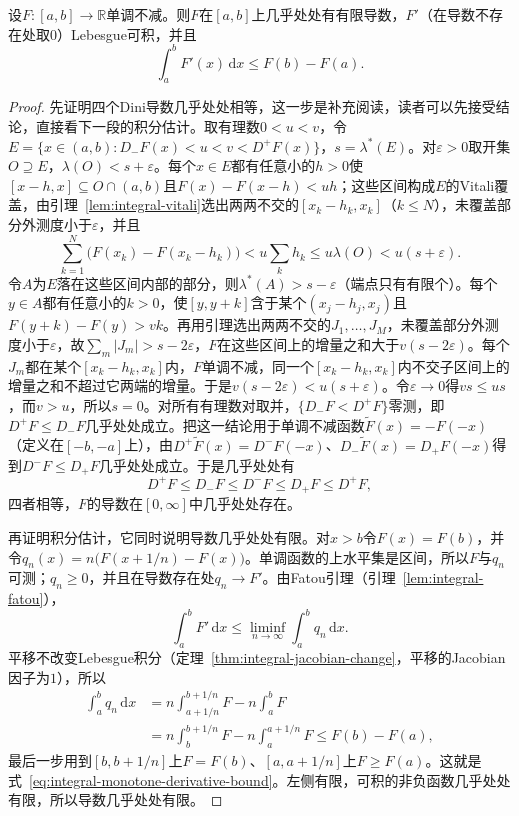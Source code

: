 \begin{theorem}[单调函数几乎处处可导]
\label{thm:integral-monotone-differentiable}
设$F:[a,b]\to\mathbb R$单调不减。则$F$在$[a,b]$上几乎处处有有限导数，$F'$（在导数不存在处取$0$）Lebesgue可积，并且
\begin{equation}
 \int_a^bF'(x)\,\mathrm dx\le F(b)-F(a).
 \label{eq:integral-monotone-derivative-bound}
\end{equation}
\end{theorem}

\begin{proof}
先证明四个Dini导数几乎处处相等，这一步是补充阅读，读者可以先接受结论，直接看下一段的积分估计。取有理数$0<u<v$，令$E=\{x\in(a,b):D_-F(x)<u<v<D^+F(x)\}$，$s=\lambda^*(E)$。对$\varepsilon>0$取开集$O\supseteq E$，$\lambda(O)<s+\varepsilon$。每个$x\in E$都有任意小的$h>0$使$[x-h,x]\subseteq O\cap(a,b)$且$F(x)-F(x-h)<uh$；这些区间构成$E$的Vitali覆盖，由引理~\ref{lem:integral-vitali}选出两两不交的$[x_k-h_k,x_k]$（$k\le N$），未覆盖部分外测度小于$\varepsilon$，并且
\[
 \sum_{k=1}^N\bigl(F(x_k)-F(x_k-h_k)\bigr)<u\sum_kh_k\le u\lambda(O)<u(s+\varepsilon).
\]
令$A$为$E$落在这些区间内部的部分，则$\lambda^*(A)>s-\varepsilon$（端点只有有限个）。每个$y\in A$都有任意小的$k>0$，使$[y,y+k]$含于某个$(x_j-h_j,x_j)$且$F(y+k)-F(y)>vk$。再用引理选出两两不交的$J_1,\ldots,J_M$，未覆盖部分外测度小于$\varepsilon$，故$\sum_m|J_m|>s-2\varepsilon$，$F$在这些区间上的增量之和大于$v(s-2\varepsilon)$。每个$J_m$都在某个$[x_k-h_k,x_k]$内，$F$单调不减，同一个$[x_k-h_k,x_k]$内不交子区间上的增量之和不超过它两端的增量。于是$v(s-2\varepsilon)<u(s+\varepsilon)$。令$\varepsilon\to0$得$vs\le us$，而$v>u$，所以$s=0$。对所有有理数对取并，$\{D_-F<D^+F\}$零测，即$D^+F\le D_-F$几乎处处成立。把这一结论用于单调不减函数$\tilde F(x)=-F(-x)$（定义在$[-b,-a]$上），由$D^+\tilde F(x)=D^-F(-x)$、$D_-\tilde F(x)=D_+F(-x)$得到$D^-F\le D_+F$几乎处处成立。于是几乎处处有
\[
 D^+F\le D_-F\le D^-F\le D_+F\le D^+F,
\]
四者相等，$F$的导数在$[0,\infty]$中几乎处处存在。

再证明积分估计，它同时说明导数几乎处处有限。对$x>b$令$F(x)=F(b)$，并令$q_n(x)=n\bigl(F(x+1/n)-F(x)\bigr)$。单调函数的上水平集是区间，所以$F$与$q_n$可测；$q_n\ge0$，并且在导数存在处$q_n\to F'$。由Fatou引理（引理~\ref{lem:integral-fatou}），
\[
 \int_a^bF'\,\mathrm dx\le\liminf_{n\to\infty}\int_a^bq_n\,\mathrm dx.
\]
平移不改变Lebesgue积分（定理~\ref{thm:integral-jacobian-change}，平移的Jacobian因子为$1$），所以
\[
 \begin{aligned}
 \int_a^bq_n\,\mathrm dx&=n\int_{a+1/n}^{b+1/n}F-n\int_a^bF\\
 &=n\int_b^{b+1/n}F-n\int_a^{a+1/n}F\le F(b)-F(a),
 \end{aligned}
\]
最后一步用到$[b,b+1/n]$上$F=F(b)$、$[a,a+1/n]$上$F\ge F(a)$。这就是式~\eqref{eq:integral-monotone-derivative-bound}。左侧有限，可积的非负函数几乎处处有限，所以导数几乎处处有限。
\end{proof}


